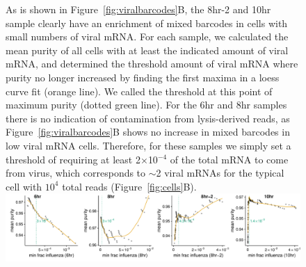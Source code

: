 \documentclass[9pt,lineno]{elife}
\begin{document}
\begin{figure}[t!]
{As is shown in Figure~\ref{fig:viralbarcodes}B, the 8hr-2 and 10hr sample clearly have an enrichment of mixed barcodes in cells with small numbers of viral mRNA.
For each sample, we calculated the mean purity of all cells with at least the indicated amount of viral mRNA, and determined the threshold amount of viral mRNA where purity no longer increased by finding the first maxima in a loess curve fit (orange line).
We called the threshold at this point of maximum purity (dotted green line).
For the 6hr and 8hr samples there is no indication of contamination from lysis-derived reads, as Figure~\ref{fig:viralbarcodes}B shows no increase in mixed barcodes in low viral mRNA cells.
Therefore, for these samples we simply set a threshold of requiring at least 2$\times$10$^{-4}$ of the total mRNA to come from virus, which corresponds to $\sim$2 viral mRNAs for the typical cell with $10^4$ total reads (Figure~\ref{fig:cells}B).
}{\includegraphics[width=\linewidth]{figures/p_purity_threshold.pdf}}


\end{figure}
\end{document}
